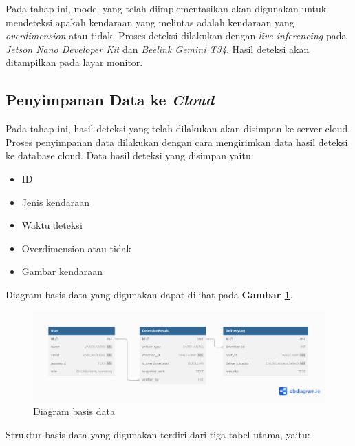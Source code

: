 Pada tahap ini, model yang telah diimplementasikan akan digunakan untuk mendeteksi apakah kendaraan yang melintas adalah kendaraan yang \emph{overdimension} atau tidak. Proses deteksi dilakukan dengan \emph{live inferencing} pada \emph{Jetson Nano Developer Kit} dan \emph{Beelink Gemini T34}. Hasil deteksi akan ditampilkan pada layar monitor.

\subsection{Penyimpanan Data ke \emph{Cloud}}

Pada tahap ini, hasil deteksi yang telah dilakukan akan disimpan ke server cloud. Proses penyimpanan data dilakukan dengan cara mengirimkan data hasil deteksi ke database cloud. Data hasil deteksi yang disimpan yaitu:

\begin{itemize}[noitemsep,nolistsep]
  \setlength{\itemsep}{5pt}
  \setlength{\parskip}{0pt}
  \setlength{\parsep}{0pt}
  \item ID
  \item Jenis kendaraan
  \item Waktu deteksi
  \item Overdimension atau tidak
  \item Gambar kendaraan
\end{itemize}

Diagram basis data yang digunakan dapat dilihat pada \textbf{Gambar \ref{fig:dbdiagram}}.

\begin{figure}[H]
  \centering

  \includegraphics[scale=0.39]{gambar/bab3-basis-data.png}

  \caption{Diagram basis data}
  \label{fig:dbdiagram}
\end{figure}

Struktur basis data yang digunakan terdiri dari tiga tabel utama, yaitu:

